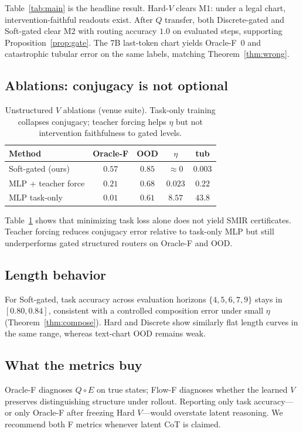 \documentclass[letterpaper,10pt,twocolumn]{article}
\theoremstyle{definition}
\begin{document}
Table~\ref{tab:main} is the headline result.
Hard-$V$ clears M1: under a legal chart, intervention-faithful readouts exist.
After $Q$ transfer, both Discrete-gated and Soft-gated clear M2 with routing accuracy $1.0$ on evaluated steps, supporting Proposition~\ref{prop:gate}.
The 7B last-token chart yields Oracle-F~$0$ and catastrophic tubular error on the same labels, matching Theorem~\ref{thm:wrong}.

\subsection{Ablations: conjugacy is not optional}
\begin{table}[t]
\centering
\small
\setlength{\tabcolsep}{3pt}
\begin{tabular}{lcccc}
\toprule
Method & Oracle-F & OOD & $\eta$ & tub \\
\midrule
Soft-gated (ours) & $0.57$ & $0.85$ & $\approx 0$ & $0.003$ \\
MLP + teacher force & $0.21$ & $0.68$ & $0.023$ & $0.22$ \\
MLP task-only & $0.01$ & $0.61$ & $8.57$ & $43.8$ \\
\bottomrule
\end{tabular}
\caption{Unstructured $V$ ablations (venue suite).
Task-only training collapses conjugacy; teacher forcing helps $\eta$ but not intervention faithfulness to gated levels.}
\label{tab:ablate}
\end{table}

Table~\ref{tab:ablate} shows that minimizing task loss alone does not yield SMIR certificates.
Teacher forcing reduces conjugacy error relative to task-only MLP but still underperforms gated structured routers on Oracle-F and OOD.

\subsection{Length behavior}
For Soft-gated, task accuracy across evaluation horizons $\{4,5,6,7,9\}$ stays in $[0.80,0.84]$, consistent with a controlled composition error under small $\eta$ (Theorem~\ref{thm:compose}).
Hard and Discrete show similarly flat length curves in the same range, whereas text-chart OOD remains weak.

\subsection{What the metrics buy}
Oracle-F diagnoses $Q\circ E$ on true states; Flow-F diagnoses whether the learned $V$ preserves distinguishing structure under rollout.
Reporting only task accuracy---or only Oracle-F after freezing Hard $V$---would overstate latent reasoning.
We recommend both F metrics whenever latent CoT is claimed.
\end{document}
